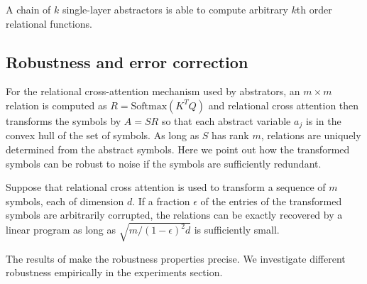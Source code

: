 \begin{result}
A chain of \(k\) single-layer  abstractors is able to compute arbitrary \(k\)th order relational functions.
\end{result}

\subsection{Robustness and error correction}

For the relational cross-attention mechanism used by abstrators, an \(m\times m\) relation
is computed as  \(R = \mbox{Softmax}(K^T Q)\)
and relational cross attention then transforms the symbols by
\(A = SR\) so that each abstract variable \(a_j\) is in the convex hull of the set of symbols.
As long as \(S\) has rank \(m\), relations are uniquely determined from the abstract symbols.
Here we point out how the transformed symbols can be robust to noise if the symbols are
sufficiently redundant. 

\begin{result}
Suppose that relational cross attention is used to transform a sequence of $m$ symbols, each of dimension $d$.
If a fraction $\epsilon$ of the entries of the transformed symbols are arbitrarily corrupted, 
the relations can be exactly recovered by a linear program as long as $\sqrt{m/(1-\epsilon)^2d}$ is sufficiently small.
\end{result}

The results of \cite{model_repair} make the robustness properties precise. We investigate different robustness  empirically in the experiments section.




